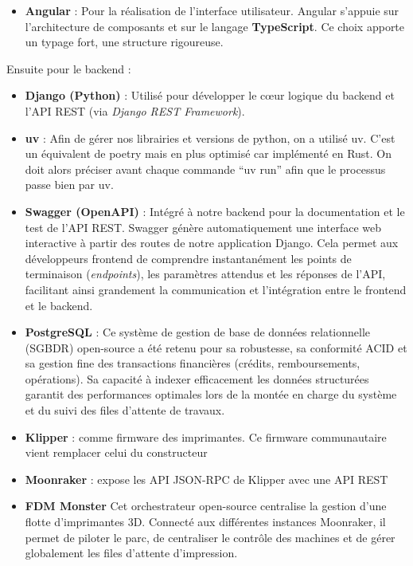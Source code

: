 \begin{itemize}
\tightlist
\item
  \textbf{Angular} : Pour la réalisation de l'interface utilisateur.
  Angular s'appuie sur l'architecture de composants et sur le langage
  \textbf{TypeScript}. Ce choix apporte un typage fort, une structure
  rigoureuse.
\end{itemize}

Ensuite pour le backend :

\begin{itemize}
\item
  \textbf{Django (Python)} : Utilisé pour développer le cœur logique du
  backend et l'API REST (via \emph{Django REST Framework}).
\item
  \textbf{uv} : Afin de gérer nos librairies et versions de python, on a
  utilisé uv. C'est un équivalent de poetry mais en plus optimisé car
  implémenté en Rust. On doit alors préciser avant chaque commande ``uv
  run'' afin que le processus passe bien par uv.
\item
  \textbf{Swagger (OpenAPI)} : Intégré à notre backend pour la
  documentation et le test de l'API REST. Swagger génère automatiquement
  une interface web interactive à partir des routes de notre application
  Django. Cela permet aux développeurs frontend de comprendre
  instantanément les points de terminaison (\emph{endpoints}), les
  paramètres attendus et les réponses de l'API, facilitant ainsi
  grandement la communication et l'intégration entre le frontend et le
  backend.
\item
  \textbf{PostgreSQL} : Ce système de gestion de base de données
  relationnelle (SGBDR) open-source a été retenu pour sa robustesse, sa
  conformité ACID et sa gestion fine des transactions financières
  (crédits, remboursements, opérations). Sa capacité à indexer
  efficacement les données structurées garantit des performances
  optimales lors de la montée en charge du système et du suivi des files
  d'attente de travaux.
\item
  \textbf{Klipper} : comme firmware des imprimantes. Ce firmware
  communautaire vient remplacer celui du constructeur
\item
  \textbf{Moonraker} : expose les API JSON-RPC de Klipper avec une API
  REST
\item
  \textbf{FDM Monster} Cet orchestrateur open-source centralise la
  gestion d'une flotte d'imprimantes 3D. Connecté aux différentes
  instances Moonraker, il permet de piloter le parc, de centraliser le
  contrôle des machines et de gérer globalement les files d'attente
  d'impression.
\end{itemize}

